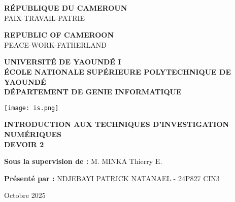 \documentclass[12pt,a4paper]{article}
\begin{document}
\begin{titlepage}
\begin{center}

\begin{minipage}{0.48\textwidth}
\begin{flushleft}
\color{blue}\textbf{RÉPUBLIQUE DU CAMEROUN}\\
\color{black}PAIX-TRAVAIL-PATRIE
\end{flushleft}
\end{minipage}
\hfill
\begin{minipage}{0.48\textwidth}
\begin{flushright}
\color{blue}\textbf{REPUBLIC OF CAMEROON}\\
\color{black}PEACE-WORK-FATHERLAND
\end{flushright}
\end{minipage}

\vspace{1.5cm}

\begin{center}
\textbf{\Large UNIVERSITÉ DE YAOUNDÉ I}\\
\textbf{\large ÉCOLE NATIONALE SUPÉRIEURE POLYTECHNIQUE DE YAOUNDÉ}\\
\textbf{\large DÉPARTEMENT DE GENIE INFORMATIQUE}
\end{center}

\vspace{1.5cm}

\begin{center}
\texttt{[image: is.png]}
\end{center}

\vspace{1.5cm}

\begin{center}
\Large \textbf{INTRODUCTION AUX TECHNIQUES D’INVESTIGATION NUMÉRIQUES}\\[0.3cm]
\LARGE \textbf{DEVOIR 2}
\end{center}

\vspace{2cm}

\begin{flushleft}
\textbf{Sous la supervision de :} M. MINKA Thierry E.
\end{flushleft}

\vspace{0.5cm}

\begin{flushleft}
\textbf{Présenté par :} NDJEBAYI PATRICK NATANAEL - 24P827 CIN3
\end{flushleft}

\vfill

\begin{center}
Octobre 2025
\end{center}

\end{center}
\end{titlepage}
\end{document}
